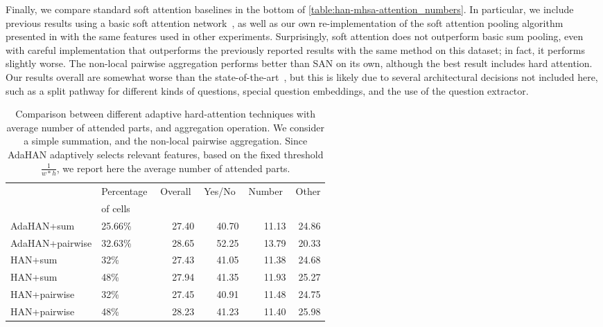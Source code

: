 Finally, we compare standard soft attention baselines in the bottom of \autoref{table:han-mhsa-attention_numbers}.
In particular, we include previous results using a basic soft attention network~\cite{agrawal2017don,yang2015stacked}, as well as our own re-implementation of the soft attention pooling algorithm presented in \cite{agrawal2017don,yang2015stacked} with the same features used in other experiments.  
Surprisingly, soft attention does not outperform basic sum pooling, even with careful implementation that outperforms the previously reported results with the same method on this dataset; in fact, it performs slightly worse. 
The non-local pairwise aggregation performs better than SAN on its own, although the best result includes hard attention.
Our results overall are somewhat worse than the state-of-the-art~\cite{agrawal2017don}, but this is likely due to several architectural decisions not included here, such as a split pathway for different kinds of questions, special question embeddings, and the use of the question extractor.

\begin{table*}\begin{center}
\begin{tabular}{llrrrr}
\toprule
 & Percentage\,\, & Overall\,\, & Yes/No\,\, & Number\,\, & Other \\
 & of cells & & & \\
 \cmidrule(l){1-1}\cmidrule(lr){2-5}
 AdaHAN+sum & 25.66\% & 27.40 & 40.70 & 11.13 & 24.86 \\
 AdaHAN+pairwise  & 32.63\% & 28.65 & 52.25 & 13.79 & 20.33 \\
 \midrule
 HAN+sum  & 32\% & 27.43 & 41.05 & 11.38 & 24.68 \\
 HAN+sum  & 48\% & 27.94 & 41.35 & 11.93 & 25.27 \\
 HAN+pairwise  & 32\% & 27.45 & 40.91 & 11.48 & 24.75 \\
 HAN+pairwise  & 48\% & 28.23 & 41.23 & 11.40 & 25.98 \\
\bottomrule
\end{tabular}
\end{center}
\caption{
Comparison between different adaptive hard-attention techniques with average number of attended parts,  and aggregation operation. We consider a simple summation, and the non-local pairwise aggregation. 
Since AdaHAN adaptively selects relevant features, based on the fixed threshold $\frac{1}{w*h}$, we report here the average number of attended parts.
}
\label{table:adaptive_han-attention_numbers}
\end{table*}

